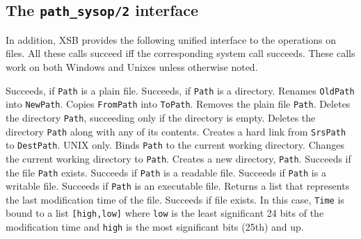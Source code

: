 \subsection{The {\tt path\_sysop/2} interface}
%
In addition, XSB provides the following unified interface to the
operations on files. All these calls succeed iff the corresponding
system call succeeds.  These calls work on both Windows and Unixes
unless otherwise noted.
\begin{description}
  Succeeds, if {\tt Path} is a plain file.
  Succeeds, if {\tt Path} is a directory.
  Renames {\tt OldPath} into {\tt NewPath}.
  Copies {\tt FromPath} into {\tt ToPath}.
    Removes the plain file {\tt Path}.
    Deletes the directory {\tt Path}, succeeding only if the directory is empty.
  Deletes the directory {\tt Path} along with any of its contents.
  Creates a hard link from {\tt SrsPath} to {\tt DestPath}. UNIX only.
  Binds {\tt Path} to the current working directory.
  Changes the current working directory to {\tt Path}.
  Creates a new directory, {\tt Path}.
  Succeeds if the file {\tt Path} exists.
  Succeeds if {\tt Path} is a readable file.
  Succeeds if {\tt Path} is a writable file.
  Succeeds if {\tt Path} is an executable file.
  Returns a list that represents the last modification time of the file.
  Succeeds if file exists. In this case, {\tt Time} is bound to a list
  {\tt [high,low]} where {\tt low} is the least significant 24 bits of the
  modification time and {\tt high} is the most significant bits (25th) and up.

\end{description}

